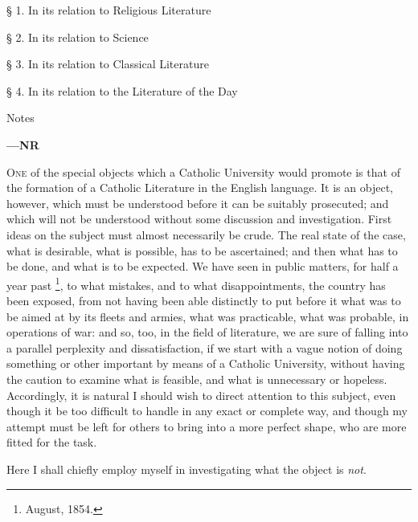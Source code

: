 
§ 1. In its relation to Religious
Literature

§ 2. In its relation to Science

§ 3. In its relation to Classical
Literature

§ 4. In its relation to the Literature
of the Day

Notes

\textbf{—NR}

O\textsc{ne} of the special objects which a Catholic University would
promote is that of the formation of a Catholic Literature in the
English language. It is an object, however, which must be understood
before it can be suitably prosecuted; and which will not be understood
without some discussion and investigation. First ideas on the subject
must almost necessarily be crude. The real state of the case, what is
desirable, what is possible, has to be ascertained; and then what has
to be done, and what is to be expected. We have seen in public
matters, for half a year past \footnote{August, 1854.}, to what mistakes, and to what disappointments, the country
has been exposed, from not having been able distinctly to put before
it what was to be aimed at by its fleets and armies, what was
practicable, what was probable, in operations of war: and so, too, in
the field of literature, we are sure of falling into a parallel
perplexity and dissatisfaction, if we start with a vague notion of
doing something or other important by means of a Catholic University,
without having the caution to examine what is feasible, and what is
unnecessary or hopeless. Accordingly, it is natural I should wish to
direct attention to this subject, even though it be too difficult to
handle in any exact or complete way, and though my attempt must be
left for others to bring into a more perfect shape, who are more
fitted for the task.

Here I shall chiefly employ myself in investigating what the object
is \emph{not}.


